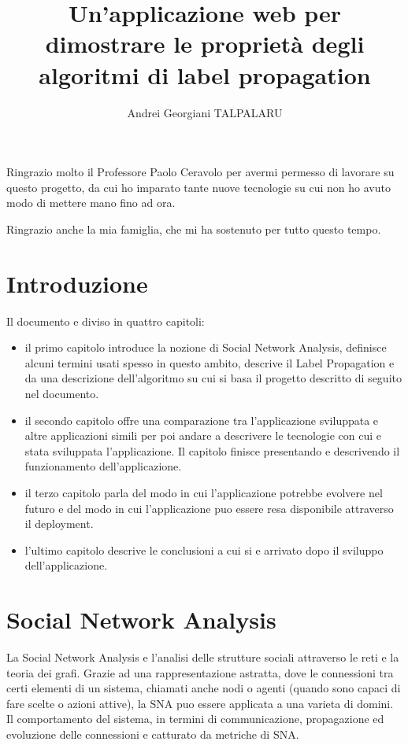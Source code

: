 \documentclass[a4paper,12pt]{report}
\begin{document}

\setcounter{secnumdepth}{5}
\setcounter{tocdepth}{5}

\title{Un'applicazione web per dimostrare le proprietà degli algoritmi di label propagation}
\author{Andrei Georgiani TALPALARU}

\beforepreface
{}
Ringrazio molto il Professore Paolo Ceravolo per avermi permesso di lavorare su questo progetto, da cui ho imparato tante nuove tecnologie su cui non ho avuto modo di mettere mano fino ad ora. 

Ringrazio anche la mia famiglia, che mi ha sostenuto per tutto questo tempo.
\afterpreface
% 
% 
%		
\chapter{Introduzione}

Il documento e diviso in quattro capitoli:
\begin{itemize}
\item il primo capitolo introduce la nozione di Social Network Analysis, definisce alcuni termini usati spesso in questo ambito, descrive il Label Propagation e da una descrizione dell'algoritmo su cui si basa il progetto descritto di seguito nel documento.

\item il secondo capitolo offre una comparazione tra l'applicazione sviluppata e altre applicazioni simili per poi andare a descrivere le tecnologie con cui e stata sviluppata l'applicazione. Il capitolo finisce presentando e descrivendo il funzionamento dell'applicazione.

\item il terzo capitolo parla del modo in cui l'applicazione potrebbe evolvere nel futuro e del modo in cui l'applicazione puo essere resa disponibile attraverso il deployment.

\item l'ultimo capitolo descrive le conclusioni a cui si e arrivato dopo il sviluppo dell'applicazione.

\end{itemize}
%

\chapter{Social Network Analysis}
	La Social Network Analysis e l'analisi delle strutture sociali attraverso le reti e la teoria dei grafi. \cite{snaintro}
	Grazie ad una rappresentazione astratta, dove le connessioni tra certi elementi di un sistema, chiamati anche nodi o agenti (quando sono capaci di fare scelte o azioni attive), la SNA puo essere applicata a una varieta di domini. Il comportamento del sistema, in termini di communicazione, propagazione ed evoluzione delle connessioni e catturato da metriche di SNA. \cite{avpra}
\end{document}
